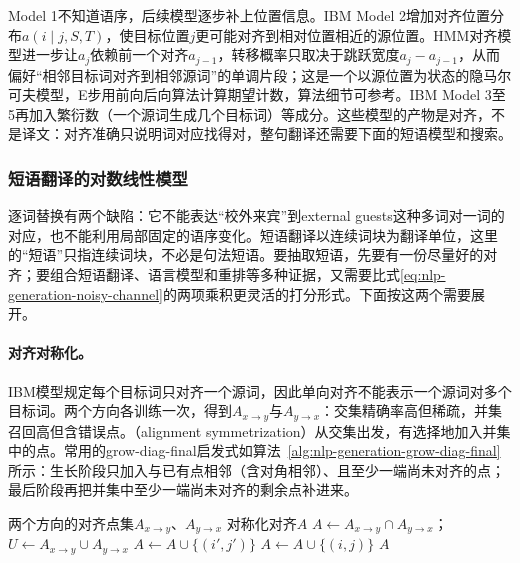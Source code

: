 Model 1不知道语序，后续模型逐步补上位置信息。IBM Model 2增加对齐位置分布$a(i\mid j,S,T)$，使目标位置$j$更可能对齐到相对位置相近的源位置。HMM对齐模型进一步让$a_j$依赖前一个对齐$a_{j-1}$，转移概率只取决于跳跃宽度$a_j-a_{j-1}$，从而偏好“相邻目标词对齐到相邻源词”的单调片段\cite{nlp-gen-vogel1996hmm}；这是一个以源位置为状态的隐马尔可夫模型，E步用前向后向算法计算期望计数，算法细节可参考。IBM Model 3至5再加入繁衍数（一个源词生成几个目标词）等成分。这些模型的产物是对齐，不是译文：对齐准确只说明词对应找得对，整句翻译还需要下面的短语模型和搜索。

\subsubsection{短语翻译的对数线性模型}
\label{sec:nlp-generation-phrase-loglinear}

逐词替换有两个缺陷：它不能表达“校外来宾”到external guests这种多词对一词的对应，也不能利用局部固定的语序变化。短语翻译以连续词块为翻译单位，这里的“短语”只指连续词块，不必是句法短语。要抽取短语，先要有一份尽量好的对齐；要组合短语翻译、语言模型和重排等多种证据，又需要比式\eqref{eq:nlp-generation-noisy-channel}的两项乘积更灵活的打分形式。下面按这两个需要展开。

\paragraph{对齐对称化。}IBM模型规定每个目标词只对齐一个源词，因此单向对齐不能表示一个源词对多个目标词。两个方向各训练一次，得到$A_{x\to y}$与$A_{y\to x}$：交集精确率高但稀疏，并集召回高但含错误点。（alignment symmetrization）从交集出发，有选择地加入并集中的点。常用的grow-diag-final启发式如算法~\ref{alg:nlp-generation-grow-diag-final}所示\cite{nlp-gen-och2003systematic}：生长阶段只加入与已有点相邻（含对角相邻）、且至少一端尚未对齐的点；最后阶段再把并集中至少一端尚未对齐的剩余点补进来。

\begin{algorithm}
  \label{alg:nlp-generation-grow-diag-final}
  \begin{algorithmic}[1]
    \Require 两个方向的对齐点集$A_{x\to y}$、$A_{y\to x}$
    \Ensure 对称化对齐$A$
    \State $A\gets A_{x\to y}\cap A_{y\to x}$；$U\gets A_{x\to y}\cup A_{y\to x}$
    \Repeat{}
          \State $A\gets A\cup\{(i',j')\}$
        \EndIf
      \EndFor
        \State $A\gets A\cup\{(i,j)\}$
      \EndIf
    \EndFor
    \State \Return $A$
  \end{algorithmic}
\end{algorithm}

